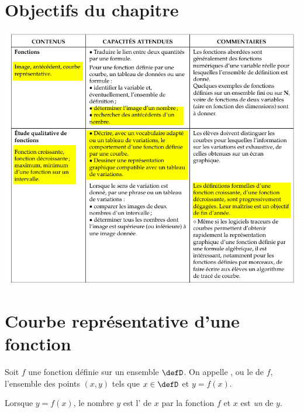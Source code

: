 
\section{Objectifs du chapitre}

\includegraphics[width=\linewidth]{BO_fonctions_graphique.png}

\section{Courbe représentative d'une fonction}



\begin{definition}
Soit $f$ une fonction définie sur un ensemble $\defD$.
    On appelle , ou le  de $f$, l'ensemble des points $(x,y)$ tels que $x\in\defD$ et $y=f(x)$.

    Lorsque \( y=f(x)\), le nombre \( y\) est l' de \( x\) par la fonction \( f\) et \( x\) est \emph{un}  de \( y\).
\end{definition}

